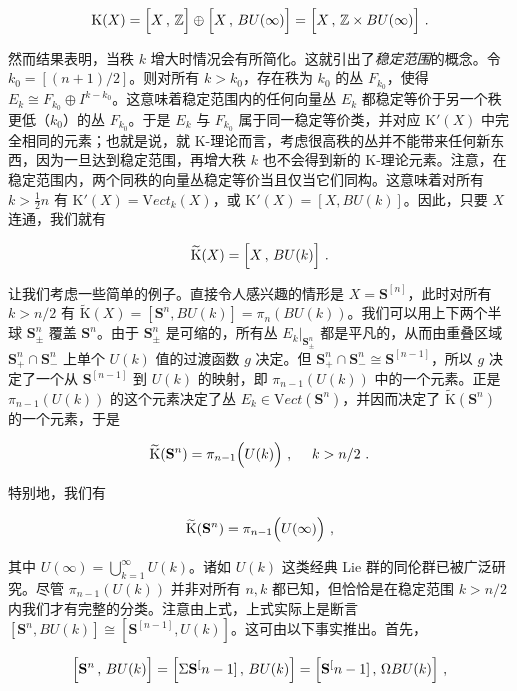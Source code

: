 \documentclass[11pt,a4paper]{ctexart}
\begin{document}
\[{\mathrm K}(X)=\Bigl[X\,,\,{\mathbb{Z}}\Bigr]\oplus
\Bigl[X\,,\,BU(\infty)\Bigr]=\Bigl[X\,,\,{\mathbb{Z}}\times BU(\infty)\Bigr]\ .\]

然而结果表明，当秩 \(k\) 增大时情况会有所简化。这就引出了\emph{稳定范围}的概念。令 \(k_0=[(n+1)/2]\)。则对所有 \(k>k_0\)，存在秩为 \(k_0\) 的丛 \(F_{k_0}\)，使得 \(E_k\cong F_{k_0}\oplus I^{k-k_0}\)。这意味着稳定范围内的任何向量丛 \(E_k\) 都稳定等价于另一个秩更低（\(k_0\)）的丛 \(F_{k_0}\)。于是 \(E_k\) 与 \(F_{k_0}\) 属于同一稳定等价类，并对应 \({\mathrm K}'(X)\) 中完全相同的元素；也就是说，就 K-理论而言，考虑很高秩的丛并不能带来任何新东西，因为一旦达到稳定范围，再增大秩 \(k\) 也不会得到新的 K-理论元素。注意，在稳定范围内，两个同秩的向量丛稳定等价当且仅当它们同构。这意味着对所有 \(k>\frac{1}{2}n\) 有 \({\mathrm K}'(X)= {\mathrm Vect}_k(X)\)，或 \({\mathrm K}'(X)= [X, BU(k)]\)。因此，只要 \(X\) 连通，我们就有

\[\widetilde{{\mathrm K}}(X)=\Bigl[X\,,\,BU(k)\Bigr]\ .\]

让我们考虑一些简单的例子。直接令人感兴趣的情形是 \(X={\mathbf S}^[n]\)，此时对所有 \(k> n/2\) 有 \(\widetilde{{\mathrm K}}(X)= [{\mathbf S}^n,BU(k)]= \pi_n(BU(k))\)。我们可以用上下两个半球 \({\mathbf S}^n_{\pm}\) 覆盖 \({\mathbf S}^n\)。由于 \({\mathbf S}^n_{\pm}\) 是可缩的，所有丛 \(E_k|_{{\mathbf S}^n_{\pm}}\) 都是平凡的，从而由重叠区域 \({\mathbf S}^n_{+}\cap {\mathbf S}^n_{-}\) 上单个 \(U(k)\) 值的过渡函数 \(g\) 决定。但 \({\mathbf S}^n_{+}\cap {\mathbf S}^n_{-}\cong {\mathbf S}^[n-1]\)，所以 \(g\) 决定了一个从 \({\mathbf S}^[n-1]\) 到 \(U(k)\) 的映射，即 \(\pi_{n-1}(U(k))\) 中的一个元素。正是 \(\pi_{n-1}(U(k))\) 的这个元素决定了丛 \(E_k\in {\mathrm Vect}({\mathbf S}^n)\)，并因而决定了 \(\widetilde{{\mathrm K}}({\mathbf S}^n)\) 的一个元素，于是

\[\widetilde{{\mathrm K}}({\mathbf S}^n)= \pi_{n-1}\Bigl(U(k)\Bigr)\ , \ \ \ \ k>n/2\ .\]

特别地，我们有

\[\widetilde{{\mathrm K}}({\mathbf S}^n)= \pi_{n-1}\Bigl(U(\infty)\Bigr)\ ,\]

其中 \(U(\infty)=\bigcup_{k=1}^{\infty}U(k)\)。诸如 \(U(k)\) 这类经典 Lie 群的同伦群已被广泛研究。尽管 \(\pi_{n-1}(U(k))\) 并非对所有 \(n,k\) 都已知，但恰恰是在稳定范围 \(k>n/2\) 内我们才有完整的分类。注意由上式，上式实际上是断言 \([{\mathbf S}^n,BU(k)]\cong[{\mathbf S}^[n-1],U(k)]\)。这可由以下事实推出。首先，

\[\Bigl[{\mathbf S}^n\,,\,BU(k)\Bigr]=\Bigl[\Sigma{\mathbf S}^[n-1]\,,\,BU(k)\Bigr]
=\Bigl[{\mathbf S}^[n-1]\,,\,\Omega BU(k)\Bigr]\ ,\]
\end{document}
